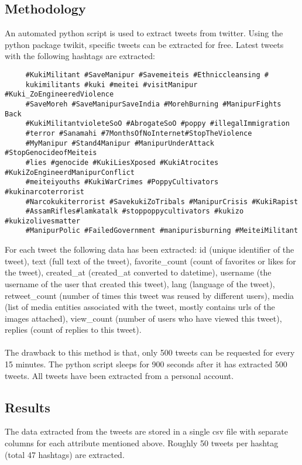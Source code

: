 \documentclass{report}
\begin{document}
\subsection{Methodology}
An automated python script is used to extract tweets from twitter. Using the python package twikit\cite{twi}, specific tweets can be extracted for free. Latest tweets with the following hashtags are extracted: 
\begin{verbatim}
     #KukiMilitant #SaveManipur #Savemeiteis #Ethniccleansing #
     kukimilitants #kuki #meitei #visitManipur #Kuki_ZoEngineeredViolence 
     #SaveMoreh #SaveManipurSaveIndia #MorehBurning #ManipurFights Back 
     #KukiMilitantvioleteSoO #AbrogateSoO #poppy #illegalImmigration 
     #terror #Sanamahi #7MonthsOfNoInternet#StopTheViolence 
     #MyManipur #Stand4Manipur #ManipurUnderAttack #StopGenocideofMeiteis 
     #lies #genocide #KukiLiesXposed #KukiAtrocites #KukiZoEngineerdManipurConflict 
     #meiteiyouths #KukiWarCrimes #PoppyCultivators #kukinarcoterrorist 
     #Narcokukiterrorist #SavekukiZoTribals #ManipurCrisis #KukiRapist 
     #AssamRifles#lamkatalk #stoppoppycultivators #kukizo #kukizolivesmatter 
     #ManipurPolic #FailedGovernment #manipurisburning #MeiteiMilitant 
\end{verbatim}
For each tweet the following data has been extracted: id (unique identifier of the tweet), text (full text of the tweet), favorite\_count (count of favorites or likes for the tweet), created\_at (created\_at converted to datetime), username (the username of the user that created this tweet), lang (language of the tweet), retweet\_count (number of times this tweet was reused by different users), media (list of media entities associated with the tweet, mostly contains urls of the images attached), view\_count (number of users who have viewed this tweet), replies (count of replies to this tweet).
\paragraph{}The drawback to this method is that, only 500 tweets can be requested for every 15 minutes. The python script sleeps for 900 seconds after it has extracted 500 tweets. All tweets have been extracted from a personal account.
\subsection{Results}
The data extracted from the tweets are stored in a single csv file with separate columns for each attribute mentioned above. Roughly 50 tweets per hashtag (total 47 hashtags) are extracted.
\end{document}
